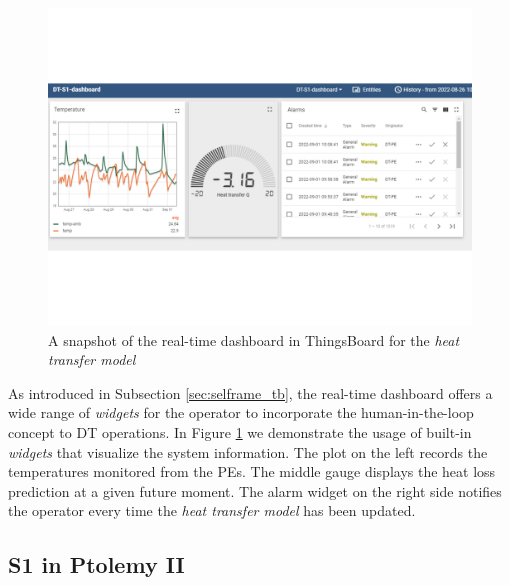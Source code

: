 \begin{figure}[hbt!]
  \centering
  \includegraphics[scale=0.5]{figures/s1_tb_dashboard.pdf}
  \caption{A snapshot of the real-time dashboard in ThingsBoard for the \textit{heat transfer model}}
  \label{fig:s1_tb_dashboard}
\end{figure}

As introduced in Subsection \ref{sec:selframe_tb}, the real-time dashboard offers a wide range of \textit{widgets} for the operator to incorporate the human-in-the-loop concept to DT operations. In Figure \ref{fig:s1_tb_dashboard} we demonstrate the usage of built-in \textit{widgets} that visualize the system information. The plot on the left records the temperatures monitored from the PEs. The middle gauge displays the heat loss prediction at a given future moment. The alarm widget on the right side notifies the operator every time the \textit{heat transfer model} has been updated.

\subsection{S1 in Ptolemy II} \label{sec:s1demopt2}

